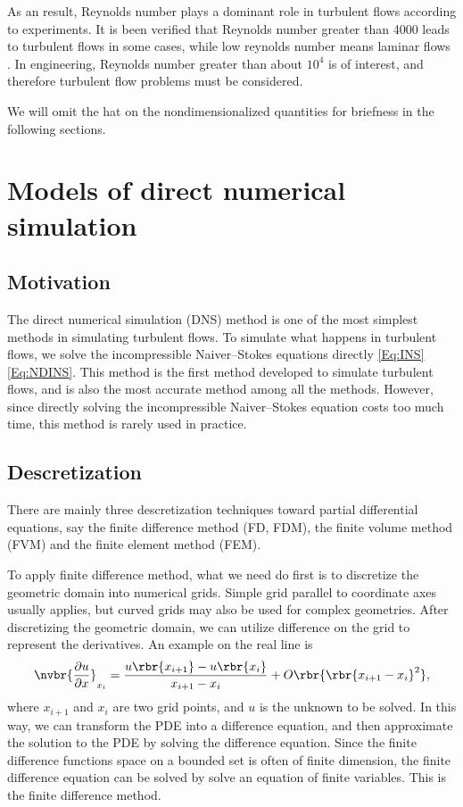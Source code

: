 \documentclass[english, nochinese]{pkupaper}
\begin{document}
As an result, Reynolds number plays a dominant role in turbulent flows according to experiments. It is been verified that Reynolds number greater than 4000 leads to turbulent flows in some cases, while low reynolds number means laminar flows \parencite{holman_heat_1986}. In engineering, Reynolds number greater than about $10^4$ is of interest, and therefore turbulent flow problems must be considered.

We will omit the hat on the nondimensionalized quantities for briefness in the following sections.

\section{Models of direct numerical simulation} \label{Sec:DNS}

\subsection{Motivation}

The direct numerical simulation (DNS) method is one of the most simplest methods in simulating turbulent flows. To simulate what happens in turbulent flows, we solve the incompressible Naiver--Stokes equations directly \eqref{Eq:INS} \eqref{Eq:NDINS}. This method is the first method developed to simulate turbulent flows, and is also the most accurate method among all the methods. However, since directly solving the incompressible Naiver--Stokes equation costs too much time, this method is rarely used in practice.

\subsection{Descretization}

There are mainly three descretization techniques toward partial differential equations, say the finite difference method (FD, FDM), the finite volume method (FVM) and the finite element method (FEM).

To apply finite difference method, what we need do first is to discretize the geometric domain into numerical grids. Simple grid parallel to coordinate axes usually applies, but curved grids may also be used for complex geometries. After discretizing the geometric domain, we can utilize difference on the grid to represent the derivatives. An example on the real line is
\begin{equation}
\nvbr{\frac{\partial u}{\partial x}}_{x_i} = \frac{u\rbr{x_{i+1}} - u\rbr{x_i}}{x_{i+1} - x_i} + O \rbr{\rbr{ x_{ i + 1 } - x_i }^2},
\end{equation}
where $x_{i+1}$ and $x_i$ are two grid points, and $u$ is the unknown to be solved. In this way, we can transform the PDE into a difference equation, and then approximate the solution to the PDE by solving the difference equation. Since the finite difference functions space on a bounded set is often of finite dimension, the finite difference equation can be solved by solve an equation of finite variables. This is the finite difference method.
\end{document}
